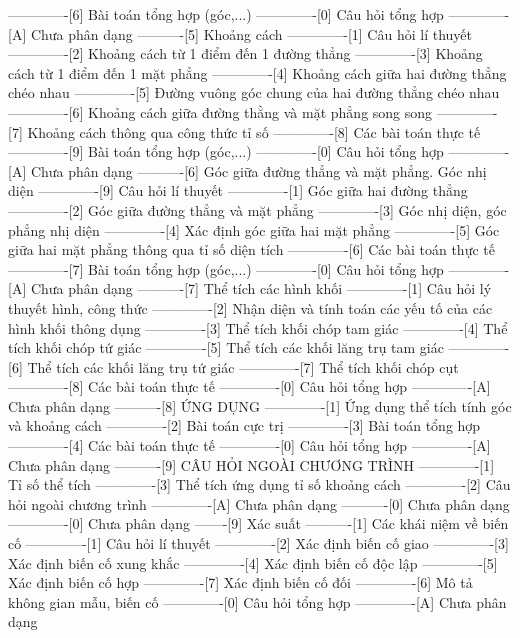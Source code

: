 -------------[6] Bài toán tổng hợp (góc,...)
-------------[0] Câu hỏi tổng hợp
-------------[A] Chưa phân dạng
----------[5] Khoảng cách
-------------[1] Câu hỏi lí thuyết
-------------[2] Khoảng cách từ 1 điểm đến 1 đường thẳng
-------------[3] Khoảng cách từ 1 điểm đến 1 mặt phẳng
-------------[4] Khoảng cách giữa hai đường thẳng chéo nhau
-------------[5] Đường vuông góc chung của hai đường thẳng chéo nhau
-------------[6] Khoảng cách giữa đường thằng và mặt phẳng song song
-------------[7] Khoảng cách thông qua công thức tỉ số
-------------[8] Các bài toán thực tế
-------------[9] Bài toán tổng hợp (góc,...)
-------------[0] Câu hỏi tổng hợp
-------------[A] Chưa phân dạng
----------[6] Góc giữa đường thẳng và mặt phẳng. Góc nhị diện
-------------[9] Câu hỏi lí thuyết
-------------[1] Góc giữa hai đường thẳng
-------------[2] Góc giữa đường thẳng và mặt phẳng
-------------[3] Góc nhị diện, góc phẳng nhị diện
-------------[4] Xác định góc giữa hai mặt phẳng
-------------[5] Góc giữa hai mặt phẳng thông qua tỉ số diện tích
-------------[6] Các bài toán thực tế
-------------[7] Bài toán tổng hợp (góc,...)
-------------[0] Câu hỏi tổng hợp
-------------[A] Chưa phân dạng
----------[7] Thể tích các hình khối
-------------[1] Câu hỏi lý thuyết hình, công thức
-------------[2] Nhận diện và tính toán các yếu tố của các hình khối thông dụng
-------------[3] Thể tích khối chóp tam giác
-------------[4] Thể tích khối chóp tứ giác
-------------[5] Thể tích các khối lăng trụ tam giác
-------------[6] Thể tích các khối lăng trụ tứ giác
-------------[7] Thể tích khối chóp cụt
-------------[8] Các bài toán thực tế
-------------[0] Câu hỏi tổng hợp
-------------[A] Chưa phân dạng
----------[8] ỨNG DỤNG
-------------[1] Ứng dụng thể tích tính góc và khoảng cách
-------------[2] Bài toán cực trị
-------------[3] Bài toán tổng hợp
-------------[4] Các bài toán thực tế
-------------[0] Câu hỏi tổng hợp
-------------[A] Chưa phân dạng
----------[9] CÂU HỎI NGOÀI CHƯƠNG TRÌNH
-------------[1] Tỉ số thể tích
-------------[3] Thể tích ứng dụng tỉ số khoảng cách
-------------[2] Câu hỏi ngoài chương trình
-------------[A] Chưa phân dạng
----------[0] Chưa phân dạng
-------------[0] Chưa phân dạng
-------[9] Xác suất
----------[1] Các khái niệm về biến cố
-------------[1] Câu hỏi lí thuyết
-------------[2] Xác định biến cố giao
-------------[3] Xác định biến cố xung khắc
-------------[4] Xác định biến cố độc lập
-------------[5] Xác định biến cố hợp
-------------[7] Xác định biến cố đối
-------------[6] Mô tả không gian mẫu, biến cố
-------------[0] Câu hỏi tổng hợp
-------------[A] Chưa phân dạng
